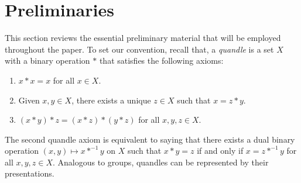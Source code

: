 \documentclass[12pt]{amsart}
\theoremstyle{definition}
\numberwithin{equation}{subsection}
\begin{document}
\section{Preliminaries}
This section reviews the essential preliminary material that will be employed throughout the paper. To set our convention, recall that, a {\it quandle} is a set $X$  with a binary operation $\ast$ that satisfies the following axioms:
\begin{enumerate}
\item $x \ast x=x$ for all $x \in X$.
\item Given $x, y \in X$, there exists a unique $z \in X$ such that $x=z*y$.
\item $(x \ast y) \ast z=(x \ast z) \ast(y \ast z)$ for all $x, y, z \in X.$
\end{enumerate}

The second quandle axiom is equivalent to saying that there exists a dual binary operation $(x , y )  \mapsto x*^{-1} y $ on $X$ such that $x * y = z$ if and only if $x = z *^{-1} y$ for all $x, y, z \in X$. Analogous to groups, quandles can be represented by their presentations.
\end{document}
